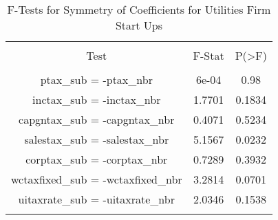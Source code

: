 
\begin{table}[!htbp] \centering 
  \caption{F-Tests for Symmetry of Coefficients for Utilities Firm Start Ups} 
  \label{22Ftests} 
\begin{tabular}{@{\extracolsep{5pt}} ccc} 
\\[-1.8ex]\hline 
\hline \\[-1.8ex] 
Test & F-Stat & P(\textgreater F) \\ 
\hline \\[-1.8ex] 
ptax\_sub = -ptax\_nbr & 6e-04 & 0.98 \\ 
inctax\_sub = -inctax\_nbr & 1.7701 & 0.1834 \\ 
capgntax\_sub = -capgntax\_nbr & 0.4071 & 0.5234 \\ 
salestax\_sub = -salestax\_nbr & 5.1567 & 0.0232 \\ 
corptax\_sub = -corptax\_nbr & 0.7289 & 0.3932 \\ 
wctaxfixed\_sub = -wctaxfixed\_nbr & 3.2814 & 0.0701 \\ 
uitaxrate\_sub = -uitaxrate\_nbr & 2.0346 & 0.1538 \\ 
\hline \\[-1.8ex] 
\end{tabular} 
\end{table} 
